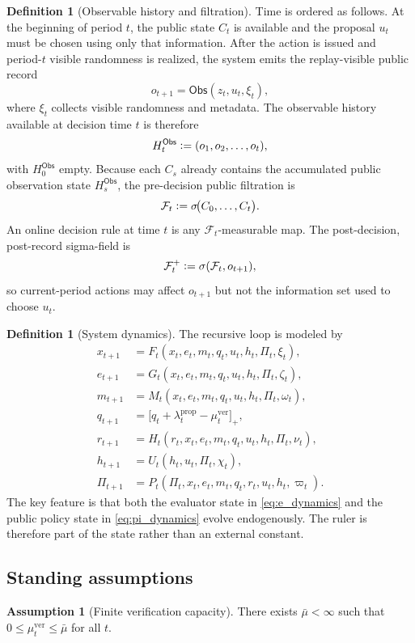 \documentclass[11pt]{article}
\theoremstyle{definition}
\newtheorem{definition}[theorem]{Definition}
\newtheorem{assumption}[theorem]{Assumption}
\newcommand{\1}{\mathbf{1}}
\newcommand{\Defeq}{\vcentcolon=}
\newcommand{\Obs}{\mathsf{Obs}}
\begin{document}
\begin{definition}[Observable history and filtration]
Time is ordered as follows. At the beginning of period $t$, the public state $C_t$ is available and the proposal $u_t$ must be chosen using only that information. After the action is issued and period-$t$ visible randomness is realized, the system emits the replay-visible public record
\[
o_{t+1}=\Obs(z_t,u_t,\xi_t),
\]
where $\xi_t$ collects visible randomness and metadata. The observable history available at decision time $t$ is therefore
\[
H_t^{\Obs}\Defeq (o_1,o_2,\dots,o_t),
\]
with $H_0^{\Obs}$ empty. Because each $C_s$ already contains the accumulated public observation state $H_s^{\Obs}$, the pre-decision public filtration is
\[
\mathcal F_t\Defeq \sigma\!\bigl(C_0,\dots,C_t\bigr).
\]
An online decision rule at time $t$ is any $\mathcal F_t$-measurable map. The post-decision, post-record sigma-field is
\[
\mathcal F_t^{+}\Defeq \sigma(\mathcal F_t,o_{t+1}),
\]
so current-period actions may affect $o_{t+1}$ but not the information set used to choose $u_t$.
\end{definition}

\begin{definition}[System dynamics]
The recursive loop is modeled by
\begin{align}
  x_{t+1} &= F_t(x_t,e_t,m_t,q_t,u_t,h_t,\Pi_t,\xi_t), \label{eq:x_dynamics}\\
  e_{t+1} &= G_t(x_t,e_t,m_t,q_t,u_t,h_t,\Pi_t,\zeta_t), \label{eq:e_dynamics}\\
  m_{t+1} &= M_t(x_t,e_t,m_t,q_t,u_t,h_t,\Pi_t,\omega_t), \label{eq:m_dynamics}\\
  q_{t+1} &= \bigl[q_t + \lambda_t^{\mathrm{prop}} - \mu_t^{\mathrm{ver}}\bigr]_+, \label{eq:q_dynamics}\\
  r_{t+1} &= H_t(r_t,x_t,e_t,m_t,q_t,u_t,h_t,\Pi_t,\nu_t), \label{eq:r_dynamics}\\
  h_{t+1} &= U_t(h_t,u_t,\Pi_t,\chi_t), \label{eq:h_dynamics}\\
  \Pi_{t+1} &= P_t(\Pi_t,x_t,e_t,m_t,q_t,r_t,u_t,h_t,\varpi_t). \label{eq:pi_dynamics}
\end{align}
The key feature is that both the evaluator state in \eqref{eq:e_dynamics} and the public policy state in \eqref{eq:pi_dynamics} evolve endogenously. The ruler is therefore part of the state rather than an external constant.
\end{definition}

\subsection{Standing assumptions}
\begin{assumption}[Finite verification capacity]\label{ass:finite_ver}
There exists $\bar\mu<\infty$ such that $0\le \mu_t^{\mathrm{ver}}\le \bar\mu$ for all $t$.
\end{assumption}
\end{document}
